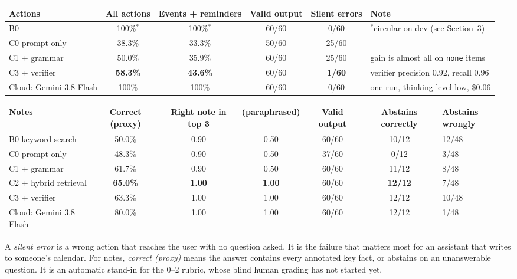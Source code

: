 \documentclass[10pt,letterpaper]{article}
\begin{document}
\begin{center}
\small
\begin{tabularx}{\textwidth}{@{}l c c c c L@{}}
\toprule
\textbf{Actions} & \textbf{All actions} & \textbf{Events + reminders} & \textbf{Valid output} & \textbf{Silent errors} & \textbf{Note} \\
\midrule
B0 & 100\%$^*$ & 100\%$^*$ & 60/60 & 0/60 & $^*$circular on dev (see Section~3) \\
C0 prompt only & 38.3\% & 33.3\% & 50/60 & 25/60 & \\
C1 + grammar & 50.0\% & 35.9\% & 60/60 & 25/60 & gain is almost all on \texttt{none} items \\
C3 + verifier & \textbf{58.3\%} & \textbf{43.6\%} & 60/60 & \textbf{1/60} & verifier precision 0.92, recall 0.96 \\
\midrule
Cloud: Gemini 3.8 Flash & 100\% & 100\% & 60/60 & 0/60 & one run, thinking level low, \$0.06 \\
\bottomrule
\end{tabularx}

\vspace{4pt}
\begin{tabularx}{\textwidth}{@{}l c c c c c L@{}}
\toprule
\textbf{Notes} & \textbf{Correct (proxy)} & \textbf{Right note in top 3} & \textbf{(paraphrased)} & \textbf{Valid output} & \textbf{Abstains correctly} & \textbf{Abstains wrongly} \\
\midrule
B0 keyword search & 50.0\% & 0.90 & 0.50 & 60/60 & 10/12 & 12/48 \\
C0 prompt only & 48.3\% & 0.90 & 0.50 & 37/60 & 0/12 & 3/48 \\
C1 + grammar & 61.7\% & 0.90 & 0.50 & 60/60 & 11/12 & 8/48 \\
C2 + hybrid retrieval & \textbf{65.0\%} & \textbf{1.00} & \textbf{1.00} & 60/60 & \textbf{12/12} & 7/48 \\
C3 + verifier & 63.3\% & 1.00 & 1.00 & 60/60 & 12/12 & 10/48 \\
\midrule
Cloud: Gemini 3.8 Flash & 80.0\% & 1.00 & 1.00 & 60/60 & 12/12 & 1/48 \\
\bottomrule
\end{tabularx}
\end{center}

A \emph{silent error} is a wrong action that reaches the user with no question asked. It is the failure that matters most for an assistant that writes to someone's calendar. For notes, \emph{correct (proxy)} means the answer contains every annotated key fact, or abstains on an unanswerable question. It is an automatic stand-in for the 0--2 rubric, whose blind human grading has not started yet.
\end{document}
